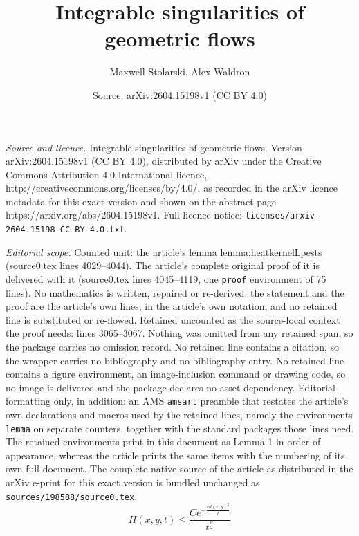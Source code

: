 \documentclass[10pt,a4paper]{amsart}
\title{Integrable singularities of geometric flows}
\author{Maxwell Stolarski, Alex Waldron}
\date{Source: arXiv:2604.15198v1 (CC BY 4.0)}
\begin{document}
\maketitle

\noindent\emph{Source and licence.} Integrable singularities of geometric flows. Version arXiv:2604.15198v1 (CC BY 4.0), distributed by arXiv under the Creative Commons Attribution 4.0 International licence, http://creativecommons.org/licenses/by/4.0/, as recorded in the arXiv licence metadata for this exact version and shown on the abstract page https://arxiv.org/abs/2604.15198v1. Full licence notice: \texttt{licenses/arxiv-2604.15198-CC-BY-4.0.txt}.\par\smallskip

\noindent\textit{Editorial scope.} Counted unit: the article's lemma lemma:heatkernelLpests (source0.tex lines 4029--4044). The article's complete original proof of it is delivered with it (source0.tex lines 4045--4119, one \texttt{proof} environment of 75 lines). No mathematics is written, repaired or re-derived: the statement and the proof are the article's own lines, in the article's own notation, and no retained line is substituted or re-flowed.  Retained uncounted as the source-local context the proof needs: lines 3065--3067.  Nothing was omitted from any retained span, so the package carries no omission record.  No retained line contains a citation, so the wrapper carries no bibliography and no bibliography entry.  No retained line contains a figure environment, an image-inclusion command or drawing code, so no image is delivered and the package declares no asset dependency.  Editorial formatting only, in addition: an AMS \texttt{amsart} preamble that restates the article's own declarations and macros used by the retained lines, namely the environments \texttt{lemma} on separate counters, together with the standard packages those lines need.  The retained environments print in this document as Lemma 1 in order of appearance, whereas the article prints the same items with the numbering of its own full document.  The complete native source of the article as distributed in the arXiv e-print for this exact version is bundled unchanged as \texttt{sources/198588/source0.tex}.
    \begin{equation}\label{heatkernelest}
        H(x,y,t) \leq \frac{Ce^{-\frac{c d(x,y)^2}{t}} }{t^{\frac{n}{2}}} 
    \end{equation}
\end{document}
